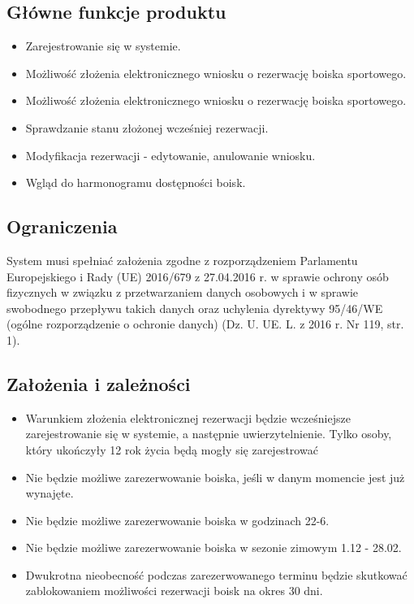 \documentclass[a4paper,11pt]{article}
\begin{document}
\subsection {Główne funkcje produktu}
\begin{itemize}
	\item Zarejestrowanie się w systemie.
	\item Możliwość złożenia elektronicznego wniosku o rezerwację boiska sportowego.
	\item Możliwość złożenia elektronicznego wniosku o rezerwację boiska sportowego.
	\item Sprawdzanie stanu złożonej wcześniej rezerwacji.
	\item Modyfikacja rezerwacji - edytowanie, anulowanie wniosku.
	\item Wgląd do harmonogramu dostępności boisk.
\end{itemize} 

\subsection {Ograniczenia}
System musi spełniać założenia zgodne z rozporządzeniem Parlamentu Europejskiego i Rady (UE) 2016/679 z 27.04.2016 r. w sprawie ochrony osób fizycznych w związku z przetwarzaniem danych osobowych i w sprawie swobodnego przepływu takich danych oraz uchylenia dyrektywy 95/46/WE (ogólne rozporządzenie o ochronie danych) (Dz. U. UE. L. z 2016 r. Nr 119, str. 1).

\subsection {Założenia i zależności}
\begin{itemize}
	\item Warunkiem złożenia elektronicznej rezerwacji będzie 			wcześniejsze zarejestrowanie się w systemie, a następnie uwierzytelnienie. Tylko osoby, który ukończyły 12 rok życia będą mogły się zarejestrować
	\item Nie będzie możliwe zarezerwowanie boiska, jeśli w danym momencie jest już wynajęte.
	\item Nie będzie możliwe zarezerwowanie boiska w godzinach 22-6.
	\item Nie będzie możliwe zarezerwowanie boiska w sezonie zimowym 1.12 - 28.02.
	\item Dwukrotna nieobecność podczas zarezerwowanego terminu będzie skutkować zablokowaniem możliwości rezerwacji boisk na okres 30 dni.
\end{itemize}
\end{document}

